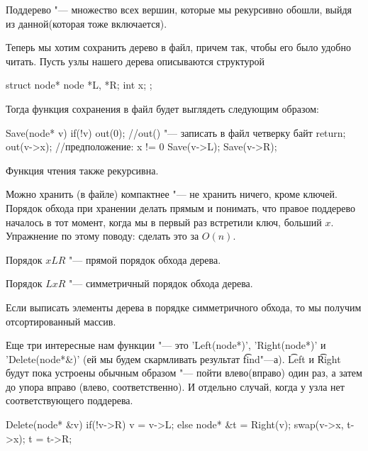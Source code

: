 \begin{Def}
	Поддерево "--- множество всех вершин, которые мы рекурсивно обошли, 
	выйдя из данной(которая тоже включается).
\end{Def}

Теперь мы хотим сохранить дерево в файл, причем так, чтобы его было удобно читать.
Пусть узлы нашего дерева описываются структурой
\begin{cppcode}
struct node* {
    node *L, *R;
    int x;
};
\end{cppcode}
Тогда функция сохранения в файл будет выглядеть следующим образом:
\begin{cppcode}
Save(node* v) {
    if(!v) {
        out(0); //out() "--- записать в файл четверку байт
        return;
    }
    out(v->x); //предположение: x != 0
    Save(v->L);
    Save(v->R);
}
\end{cppcode}
Функция чтения также рекурсивна.

Можно хранить (в файле) компактнее "--- не хранить ничего, кроме ключей. 
Порядок обхода при хранении делать прямым и понимать, что правое поддерево 
началось в тот момент, когда мы в первый раз встретили ключ, больший $x$.
Упражнение по этому поводу: сделать  это за $O(n)$.

\begin{Def}
	Порядок $xLR$ "--- прямой порядок обхода дерева.
	
	Порядок $LxR$ "--- симметричный порядок обхода дерева.
\end{Def}

\begin{Rem}
	Если выписать элементы дерева в порядке симметричного обхода, 
	то мы получим отсортированный массив.
\end{Rem}

Еще три интересные нам функции "--- это \cpp'Left(node*)', \cpp'Right(node*)' и \cpp'Delete(node*&)'
(ей мы будем скармливать результат \t{find}"---а). 
\t{Left} и \t{Right} будут пока устроены обычным образом "--- 
пойти влево(вправо) один раз, а затем до упора вправо (влево, соответственно). 
И отдельно случай, когда у узла нет соответствующего поддерева.

\begin{cppcode}
Delete(node* &v) {
	if(!v->R)
		v = v->L;
	else {
		node* &t = Right(v);
		swap(v->x, t->x);
		t = t->R;
	}
}
\end{cppcode}

